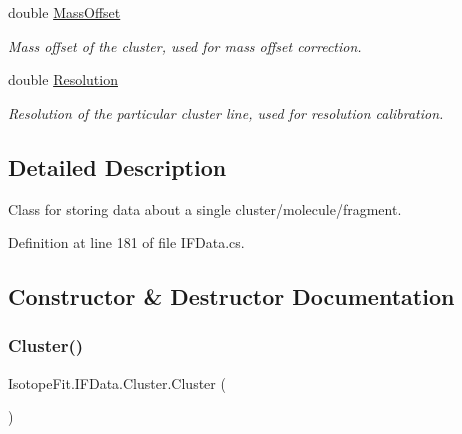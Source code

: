 \begin{DoxyCompactItemize}
double \hyperlink{class_isotope_fit_1_1_i_f_data_1_1_cluster_afa64046ba8bdad51edc7ca5c1c39cd8c}{Mass\+Offset}
\begin{DoxyCompactList}\small\item\em Mass offset of the cluster, used for mass offset correction. \end{DoxyCompactList}\item 
double \hyperlink{class_isotope_fit_1_1_i_f_data_1_1_cluster_ad98e129dd08bfd98df4b474b4c9139f8}{Resolution}
\begin{DoxyCompactList}\small\item\em Resolution of the particular cluster line, used for resolution calibration. \end{DoxyCompactList}\end{DoxyCompactItemize}


\subsection{Detailed Description}
Class for storing data about a single cluster/molecule/fragment. 



Definition at line 181 of file I\+F\+Data.\+cs.



\subsection{Constructor \& Destructor Documentation}
\mbox{\label{class_isotope_fit_1_1_i_f_data_1_1_cluster_ada019f0710b46fddad5f74a541deb4da}} 
\subsubsection{\texorpdfstring{Cluster()}{Cluster()}}
{\footnotesize\ttfamily Isotope\+Fit.\+I\+F\+Data.\+Cluster.\+Cluster (\begin{DoxyParamCaption}{ }\end{DoxyParamCaption})}



